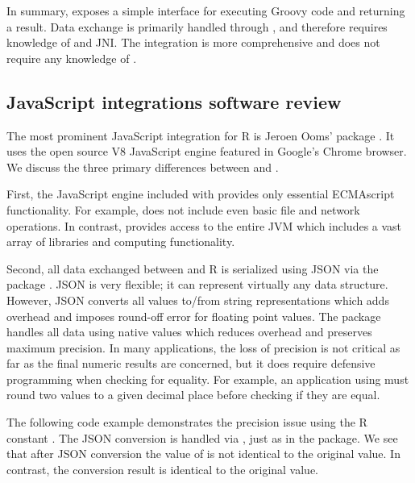 In summary,  exposes a simple interface for executing Groovy code and returning a result. Data exchange is primarily handled through , and therefore requires knowledge of  and JNI. The  integration is more comprehensive and does not require any knowledge of .

\hypertarget{javascript-integrations}{}
\subsection{JavaScript integrations software review}

The most prominent JavaScript integration for R is Jeroen Ooms'  package \citeyearpar{v8pkg}. It uses the open source V8 JavaScript engine \citep{v8javascript} featured in Google's Chrome browser. We discuss the three primary differences between  and .

First, the JavaScript engine included with  provides only essential ECMAscript functionality. For example,  does not include even basic file and network operations. In contrast,  provides access to the entire JVM which includes a vast array of libraries and computing functionality.

Second, all data exchanged between  and R is serialized using JSON via the  package \citep{jsonlite}. JSON is very flexible; it can represent virtually any data structure. However, JSON converts all values to/from string representations which adds overhead and imposes round-off error for floating point values. The  package handles all data using native values which reduces overhead and preserves maximum precision. In many applications, the loss of precision is not critical as far as the final numeric results are concerned, but it does require defensive programming when checking for equality. For example, an application using  must round two values to a given decimal place before checking if they are equal. 

The following code example demonstrates the precision issue using the R constant . The JSON conversion is handled via , just as in the  package. We see that after JSON conversion the value of  is not identical to the original value. In contrast, the  conversion result is identical to the original value.


